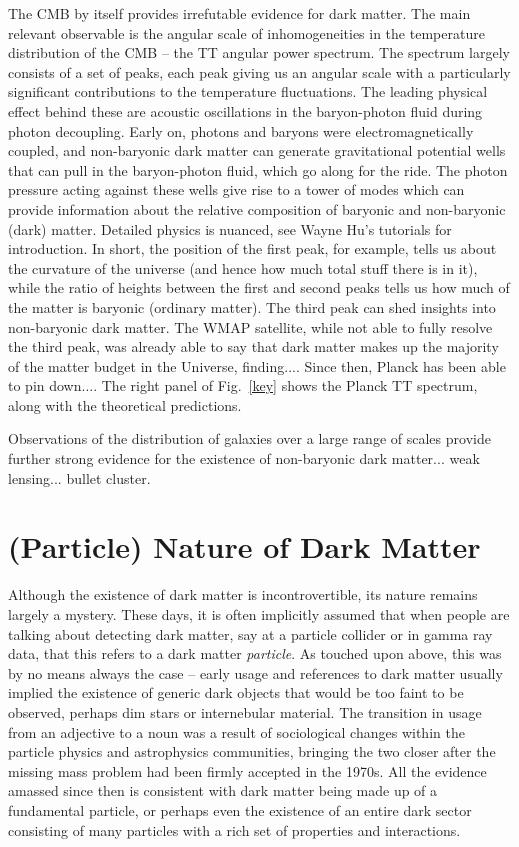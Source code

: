 The CMB by itself provides irrefutable evidence for dark matter. The main relevant observable is the angular scale of inhomogeneities in the temperature distribution of the CMB -- the TT angular power spectrum. The spectrum largely consists of a set of peaks, each peak giving us an angular scale with a particularly significant contributions to the temperature fluctuations. The leading physical effect behind these are acoustic oscillations in the baryon-photon fluid during photon decoupling. Early on, photons and baryons were electromagnetically coupled, and non-baryonic dark matter can generate gravitational potential wells that can pull in the baryon-photon fluid, which go along for the ride. The photon pressure acting against these wells give rise to a tower of modes which can provide information about the relative composition of baryonic and non-baryonic (dark) matter. Detailed physics is nuanced, see Wayne Hu's tutorials for introduction. In short, the position of the first peak, for example, tells us about the curvature of the universe (and hence how much total stuff there is in it), while the ratio of heights between the first and second peaks tells us how much of the matter is baryonic (ordinary matter). The third peak can shed insights into non-baryonic dark matter. The WMAP satellite, while not able to fully resolve the third peak, was already able to say that dark matter makes up the majority of the matter budget in the Universe, finding.... Since then, Planck has been able to pin down.... The right panel of Fig.~\ref{key} shows the Planck TT spectrum, along with the theoretical predictions.

Observations of the distribution of galaxies over a large range of scales provide further strong evidence for the existence of non-baryonic dark matter... weak lensing... bullet cluster.

\section{(Particle) Nature of Dark Matter}
\label{sec:particledm}

Although the existence of dark matter is incontrovertible, its nature remains largely a mystery. These days, it is often implicitly assumed that when people are talking about detecting dark matter, say at a particle collider or in gamma ray data, that this refers to a dark matter \emph{particle}. As touched upon above, this was by no means always the case -- early usage and references to dark matter usually implied the existence of generic dark objects that would be too faint to be observed, perhaps dim stars or internebular material. The transition in usage from an adjective to a noun was a result of sociological changes within the particle physics and astrophysics communities, bringing the two closer after the missing mass problem had been firmly accepted in the 1970s. All the evidence amassed since then is consistent with dark matter being made up of a fundamental particle, or perhaps even the existence of an entire dark sector consisting of many particles with a rich set of properties and interactions.

